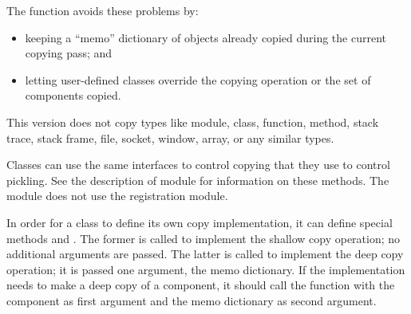 The  function avoids these problems by:

\begin{itemize}

\item
keeping a ``memo'' dictionary of objects already copied during the current
copying pass; and

\item
letting user-defined classes override the copying operation or the
set of components copied.

\end{itemize}

This version does not copy types like module, class, function, method,
stack trace, stack frame, file, socket, window, array, or any similar
types.

Classes can use the same interfaces to control copying that they use
to control pickling.  See the description of module
 for information on these
methods.  The  module does not use the
 registration module.

In order for a class to define its own copy implementation, it can
define special methods  and
.  The former is called to implement the
shallow copy operation; no additional arguments are passed.  The
latter is called to implement the deep copy operation; it is passed
one argument, the memo dictionary.  If the 
implementation needs to make a deep copy of a component, it should
call the  function with the component as first
argument and the memo dictionary as second argument.

\begin{seealso}
\end{seealso}

